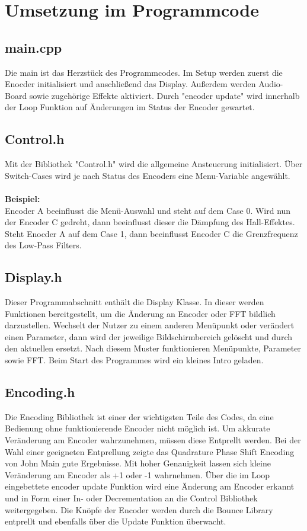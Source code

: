 \documentclass[12pt]{article}
\begin{document}
\section{Umsetzung im Programmcode}
\subsection{main.cpp}
Die main ist das Herzstück des Programmcodes. Im Setup werden zuerst die Enocder initialisiert und anschließend das Display. 
Außerdem werden Audio-Board sowie zugehörige Effekte aktiviert. 
Durch "encoder update" wird innerhalb der Loop Funktion auf Änderungen im Status der Encoder gewartet.
\subsection{Control.h}
Mit der Bibliothek "Control.h" wird die allgemeine Ansteuerung initialisiert. Über Switch-Cases wird je nach Status des Encoders eine Menu-Variable angewählt. 
\\
\\
\textbf{Beispiel:}
\\
Encoder A beeinflusst die Menü-Auswahl und steht auf dem Case 0. Wird nun der Encoder C gedreht, dann beeinflusst dieser die Dämpfung des Hall-Effektes.
Steht Enocder A auf dem Case 1, dann beeinflusst Encoder C die Grenzfrequenz des Low-Pass Filters.
\subsection{Display.h}
Dieser Programmabschnitt enthält die Display Klasse. In dieser werden Funktionen bereitgestellt, um die Änderung an Encoder oder FFT bildlich darzustellen.  
Wechselt der Nutzer zu einem anderen Menüpunkt oder verändert einen Parameter, dann wird der jeweilige Bildschirmbereich gelöscht und durch den aktuellen ersetzt. 
Nach diesem Muster funktionieren Menüpunkte, Parameter sowie FFT. Beim Start des Programmes wird ein kleines Intro geladen.

\subsection{Encoding.h}
Die Encoding Bibliothek ist einer der wichtigsten Teile des Codes, da eine Bedienung ohne funktionierende Encoder nicht möglich ist. Um akkurate Veränderung am Encoder wahrzunehmen, 
müssen diese Entprellt werden. Bei der Wahl einer geeigneten Entprellung zeigte das Quadrature Phase Shift Encoding von John Main gute Ergebnisse. Mit hoher Genauigkeit lassen sich 
kleine Veränderung am Encoder als +1 oder -1 wahrnehmen. Über die im Loop eingebettete encoder update Funktion wird eine Änderung am Encoder erkannt und in Form einer In- oder Decrementation an die Control 
Bibliothek weitergegeben. Die Knöpfe der Encoder werden durch die Bounce Library entprellt und ebenfalls über die Update Funktion überwacht.   
\end{document}
